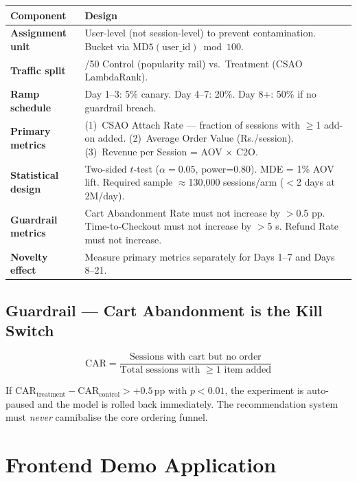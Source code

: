 \documentclass[11pt,a4paper]{article}
\begin{document}
{\small
\begin{tabularx}{\linewidth}{>{\bfseries\RaggedRight\arraybackslash}p{3cm} >{\RaggedRight\arraybackslash}X}
  \toprule
  Component & Design \\
  \midrule
  Assignment unit &
    User-level (not session-level) to prevent contamination.
    Bucket via $\text{MD5}(\text{user\_id}) \bmod 100$. \\[3pt]
  Traffic split &
    50/50 Control (popularity rail) vs.\ Treatment (CSAO LambdaRank). \\[3pt]
  Ramp schedule &
    Day 1--3: 5\% canary. Day 4--7: 20\%. Day 8+: 50\% if no
    guardrail breach. \\[3pt]
  Primary metrics &
    (1)~CSAO Attach Rate --- fraction of sessions with $\geq$1 add-on added.
    (2)~Average Order Value (Rs./session).
    (3)~Revenue per Session = AOV $\times$ C2O. \\[3pt]
  Statistical design &
    Two-sided $t$-test ($\alpha=0.05$, power=0.80). MDE = 1\% AOV lift.
    Required sample $\approx$130{,}000 sessions/arm ($<$2 days at 2M/day). \\[3pt]
  Guardrail metrics &
    Cart Abandonment Rate must not increase by $>$0.5 pp.
    Time-to-Checkout must not increase by $>$5 s.
    Refund Rate must not increase. \\[3pt]
  Novelty effect &
    Measure primary metrics separately for Days 1--7 and Days 8--21. \\
  \bottomrule
\end{tabularx}
}

\subsection{Guardrail --- Cart Abandonment is the Kill Switch}

\[
  \text{CAR} =
  \frac{\text{Sessions with cart but no order}}
       {\text{Total sessions with }\geq 1\text{ item added}}
\]

If $\text{CAR}_{\text{treatment}} - \text{CAR}_{\text{control}}
> +0.5\,\text{pp}$ with $p < 0.01$, the experiment is auto-paused
and the model is rolled back immediately. The recommendation system
must \emph{never} cannibalise the core ordering funnel.

\section{Frontend Demo Application}
\end{document}
